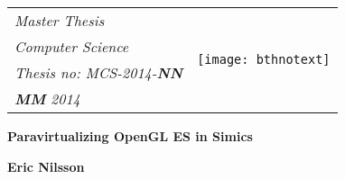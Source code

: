 
\newcommand{\intellogo}[1]{%
	\texttt{[image: Intel-logo.pdf]}%
}
\newcommand{\logossize}{3cm}


{\pagestyle{empty}
\changepage{5cm}{1cm}{-0.5cm}{-0.5cm}{}{-2cm}{}{}{}
\noindent%
{\small
\begin{tabular}{p{} p{}}
\textit{Master Thesis}&\multirow{4}{*}{\texttt{[image: bthnotext]}}\\ %
\textit{Computer Science}\\
\textit{Thesis no: MCS-2014-\textbf{NN}}\\ %
\textit{\textbf{MM} 2014}\\ %
\end{tabular}}

\begin{center}
\par\vspace {7cm}
{\Huge\textbf{Paravirtualizing OpenGL ES in Simics}} %
\par\vspace {0.5cm}
{\Large\textbf{}} %
\par\vspace {3cm}
{\Large\textbf{Eric Nilsson}}
\par\vspace {7cm}
\end{center}

\noindent
\iftoggle{intellogo}{
	{\small
	\begin{tabular}{p{0.75\textwidth} p{0.25\textwidth}}
	Faculty of Computing&\multirow{4}{*}{\intellogo{\logossize}}\\
	Blekinge Institute of Technology\\
	SE--371 79 Karlskrona, Sweden
	\end{tabular}}
}{
	{\small
	\begin{tabular}{p{0.75\textwidth} p{0.25\textwidth}}
	Faculty of Computing&\multirow{4}{*}{}\\
	Blekinge Institute of Technology\\
	SE--371 79 Karlskrona, Sweden
	\end{tabular}}
}
\clearpage
}

